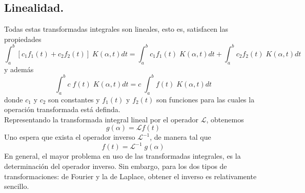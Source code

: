 \subsection*{Linealidad.}
Todas estas transformadas integrales son lineales, esto es, satisfacen las propiedades
\begin{equation}
\int_{a}^{b} [ c_{1} f_{1} (t) + c_{2} f_{2}(t)] \; K(\alpha,t) dt = \int_{a}^{b}  c_{1} f_{1} (t) \; K(\alpha,t) dt + \int_{a}^{b}  c_{2} f_{2} (t) \; K(\alpha,t) dt 
\label{eq:ecuacion_7_07} 
\end{equation}
y además
\begin{equation}
\int_{a}^{b}  c \; f (t) \; K(\alpha,t) dt =  c \; \int_{a}^{b}  f (t) \; K(\alpha,t) dt
\label{eq:ecuacion_7_08}
\end{equation}
donde $c_{1}$ y $c_{2}$ son constantes y $f_{1}(t)$ y $f_{2}(t)$ son funciones para las cuales la operación transformada está definda.
\\
Representando la transformada integral lineal por el operador $\mathcal{L}$, obtenemos
\begin{equation}
g(\alpha) = \mathcal{L} f(t)
\label{eq:ecuacion_7_09}
\end{equation}
Uno espera que exista el operador inverso $\mathcal{L}^{-1}$, de manera tal que
\begin{equation}
f(t) = \mathcal{L}^{-1}  \; g (\alpha)
\label{eq:ecuacion_7_10}
\end{equation}
En general, el mayor problema en uso de las transformadas integrales, es la determinación del operador inverso. Sin embargo, para los dos tipos de transformaciones: de Fourier y la de Laplace, obtener el inverso es relativamente sencillo.

